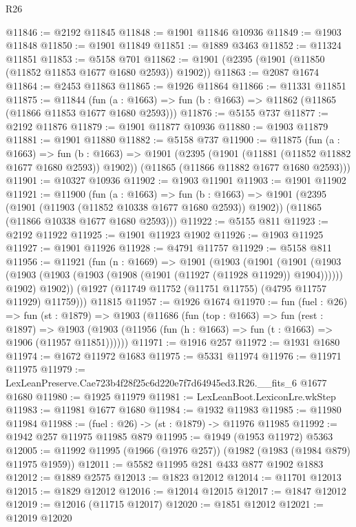\begin{lexlean}{R26}
\begin{coremodule}
@11846 := @2192 @11845
@11848 := @1901 @11846 @10936
@11849 := @1903 @11848
@11850 := @1901 @11849
@11851 := @1889 @3463
@11852 := @11324 @11851
@11853 := @5158 @701
@11862 := @1901 (@2395 (@1901 (@11850 (@11852 @11853 @1677 @1680 @2593)) @1902))
@11863 := @2087 @1674
@11864 := @2453 @11863
@11865 := @1926 @11864
@11866 := @11331 @11851
@11875 := @11844
    (fun (a : @1663) => fun (b : @1663) => @11862 (@11865 (@11866 @11853 @1677 @1680 @2593)))
@11876 := @5155 @737
@11877 := @2192 @11876
@11879 := @1901 @11877 @10936
@11880 := @1903 @11879
@11881 := @1901 @11880
@11882 := @5158 @737
@11900 := @11875
    (fun (a : @1663) =>
    fun (b : @1663) =>
    @1901
      (@2395 (@1901 (@11881 (@11852 @11882 @1677 @1680 @2593)) @1902))
      (@11865 (@11866 @11882 @1677 @1680 @2593)))
@11901 := @10327 @10936
@11902 := @1903 @11901
@11903 := @1901 @11902
@11921 := @11900
    (fun (a : @1663) =>
    fun (b : @1663) =>
    @1901
      (@2395 (@1901 (@11903 (@11852 @10338 @1677 @1680 @2593)) @1902))
      (@11865 (@11866 @10338 @1677 @1680 @2593)))
@11922 := @5155 @811
@11923 := @2192 @11922
@11925 := @1901 @11923 @1902
@11926 := @1903 @11925
@11927 := @1901 @11926
@11928 := @4791 @11757
@11929 := @5158 @811
@11956 := @11921
    (fun (n : @1669) =>
    @1901
      (@1903
        (@1901
          (@1901
            (@1903 (@1903 (@1903 (@1903 (@1908 (@1901 (@11927 (@11928 @11929)) @1904))))))
            @1902)
          @1902))
      (@1927 (@11749 @11752 (@11751 @11755) (@4795 @11757 @11929) @11759)))
    @11815
@11957 := @1926 @1674
@11970 := fun (fuel : @26) =>
  fun (st : @1879) =>
  @1903
    (@11686
      (fun (top : @1663) =>
      fun (rest : @1897) =>
      @1903 (@1903 (@11956 (fun (h : @1663) => fun (t : @1663) => @1906 (@11957 @11851))))))
@11971 := @1916 @257
@11972 := @1931 @1680
@11974 := @1672 @11972 @1683
@11975 := @5331 @11974
@11976 := @11971 @11975
@11979 := LexLeanPreserve.Cae723b4f28f25c6d220e7f7d64945ed3.R26.__fits_6 @1677 @1680
@11980 := @1925 @11979
@11981 := LexLeanBoot.LexiconLre.wkStep
@11983 := @11981 @1677 @1680
@11984 := @1932 @11983
@11985 := @11980 @11984
@11988 := (fuel : @26) -> (st : @1879) -> @11976 @11985
@11992 := @1942 @257 @11975 @11985 @879
@11995 := @1949 (@1953 @11972) @5363
@12005 := @11992 @11995 (@1966 (@1976 @257)) (@1982 (@1983 (@1984 @879) @11975 @1959))
@12011 := @5582 @11995 @281 @433 @877 @1902 @1883
@12012 := @1889 @2575
@12013 := @1823 @12012
@12014 := @11701 @12013
@12015 := @1829 @12012
@12016 := @12014 @12015
@12017 := @1847 @12012
@12019 := @12016 (@11715 @12017)
@12020 := @1851 @12012
@12021 := @12019 @12020

\end{coremodule}
\end{lexlean}
